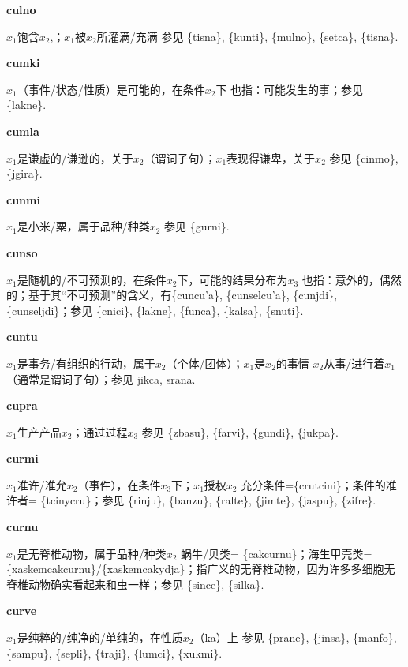 \documentclass[notitlepage,twocolumn,a4paper,10pt]{book}
\begin{document}
{\sffamily\bfseries culno}\enspace {\ttfamily\bfseries[    clu]}  $x_1$饱含$x_2$,；$x_1$被$x_2$所灌满\slash{}充满 \textemdash{} 参见 \{tisna\}, \{kunti\}, \{mulno\}, \{setca\}, \{tisna\}.

{\sffamily\bfseries cumki}\enspace {\ttfamily\bfseries[cum     cu'i]}  $x_1$（事件\slash{}状态\slash{}性质）是可能的，在条件$x_2$下 \textemdash{} 也指：可能发生的事；参见 \{lakne\}.

{\sffamily\bfseries cumla}\enspace {\ttfamily\bfseries[cul]}  $x_1$是谦虚的\slash{}谦逊的，关于$x_2$（谓词子句）；$x_1$表现得谦卑，关于$x_2$ \textemdash{} 参见 \{cinmo\}, \{jgira\}.

{\sffamily\bfseries cunmi} $x_1$是小米\slash{}粟，属于品种\slash{}种类$x_2$ \textemdash{} 参见 \{gurni\}.

{\sffamily\bfseries cunso}\enspace {\ttfamily\bfseries[cun     cu'o]}  $x_1$是随机的\slash{}不可预测的，在条件$x_2$下，可能的结果分布为$x_3$ \textemdash{} 也指：意外的，偶然的；基于其“不可预测”的含义，有\{cuncu'a\}, \{cunselcu'a\}, \{cunjdi\}, \{cunseljdi\}；参见 \{cnici\}, \{lakne\}, \{funca\}, \{kalsa\}, \{snuti\}.

{\sffamily\bfseries cuntu}\enspace {\ttfamily\bfseries[        cu'u]}  $x_1$是事务\slash{}有组织的行动，属于$x_2$（个体\slash{}团体）；$x_1$是$x_2$的事情 \textemdash{} $x_2$从事\slash{}进行着$x_1$ （通常是谓词子句）；参见 {jikca}, {srana}.

{\sffamily\bfseries cupra}\enspace {\ttfamily\bfseries[    pra]}  $x_1$生产产品$x_2$；通过过程$x_3$ \textemdash{} 参见 \{zbasu\}, \{farvi\}, \{gundi\}, \{jukpa\}.

{\sffamily\bfseries curmi}\enspace {\ttfamily\bfseries[    cru]}  $x_1$准许\slash{}准允$x_2$（事件），在条件$x_3$下；$x_1$授权$x_2$ \textemdash{} 充分条件=\{crutcini\}；条件的准许者= \{tcinycru\}；参见 \{rinju\}, \{banzu\}, \{ralte\}, \{jimte\}, \{jaspu\}, \{zifre\}.

{\sffamily\bfseries curnu}\enspace {\ttfamily\bfseries[cur]}  $x_1$是无脊椎动物，属于品种\slash{}种类$x_2$ \textemdash{} 蜗牛\slash{}贝类= \{cakcurnu\}；海生甲壳类= \{xaskemcakcurnu\}\slash{}\{xaskemcakydja\}；指广义的无脊椎动物，因为许多多细胞无脊椎动物确实看起来和虫一样；参见 \{since\}, \{silka\}.

{\sffamily\bfseries curve}\enspace {\ttfamily\bfseries[cuv]}  $x_1$是纯粹的\slash{}纯净的\slash{}单纯的，在性质$x_2$（ka）上 \textemdash{} 参见 \{prane\}, \{jinsa\}, \{manfo\}, \{sampu\}, \{sepli\}, \{traji\}, \{lumci\}, \{xukmi\}.
\end{document}
